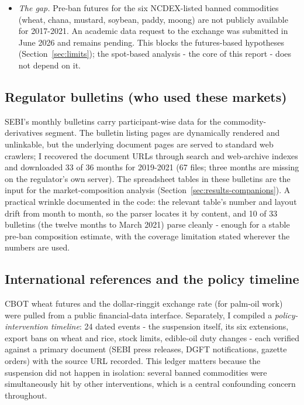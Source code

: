 \documentclass[11pt]{article}
\begin{document}
\begin{itemize}[leftmargin=1.6em,itemsep=1pt]
        both generations were pulled (77 $+$ 15 contracts). The unit break, and cotton's
        own trading halt in August 2022, are reasons cotton is treated cautiously as a
        control.
  \item \emph{The gap.} Pre-ban futures for the six NCDEX-listed banned commodities
        (wheat, chana, mustard, soybean, paddy, moong) are not publicly available for
        2017-2021. An academic data request to the exchange was submitted in June 2026
        and remains pending. This blocks the futures-based hypotheses
        (Section~\ref{sec:limits}); the spot-based analysis - the core of this report
 - does not depend on it.
\end{itemize}

\subsection{Regulator bulletins (who used these markets)}
SEBI's monthly bulletins carry participant-wise data for the commodity-derivatives
segment. The bulletin listing pages are dynamically rendered and unlinkable, but the
underlying document pages are served to standard web crawlers; I recovered the document
URLs through search and web-archive indexes and downloaded 33 of 36 months for
2019-2021 (67 files; three months are missing on the regulator's own server). The
spreadsheet tables in these bulletins are the input for the market-composition analysis
(Section~\ref{sec:results-companions}). A practical wrinkle documented in the code: the
relevant table's number and layout drift from month to month, so the parser locates it by
content, and 10 of 33 bulletins (the twelve months to March 2021) parse cleanly - enough
for a stable pre-ban composition estimate, with the coverage limitation stated wherever
the numbers are used.

\subsection{International references and the policy timeline}
CBOT wheat futures and the dollar-ringgit exchange rate (for palm-oil work) were pulled
from a public financial-data interface. Separately, I compiled a
\emph{policy-intervention timeline}: 24 dated events - the suspension itself, its six
extensions, export bans on wheat and rice, stock limits, edible-oil duty changes - each
verified against a primary document (SEBI press releases, DGFT notifications, gazette
orders) with the source URL recorded. This ledger matters because the suspension did not
happen in isolation: several banned commodities were simultaneously hit by other
interventions, which is a central confounding concern throughout.
\end{document}
